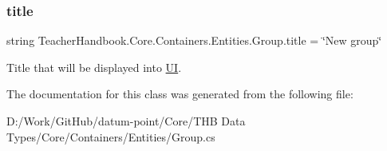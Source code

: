 \subsubsection{\texorpdfstring{title}{title}}
{\footnotesize\ttfamily string Teacher\+Handbook.\+Core.\+Containers.\+Entities.\+Group.\+title = \char`\"{}New group\char`\"{}}



Title that will be displayed into \mbox{\hyperlink{namespace_teacher_handbook_1_1_u_i}{UI}}. 



The documentation for this class was generated from the following file\+:\begin{DoxyCompactItemize}
\item 
D\+:/\+Work/\+Git\+Hub/datum-\/point/\+Core/\+T\+H\+B Data Types/\+Core/\+Containers/\+Entities/Group.\+cs\end{DoxyCompactItemize}
